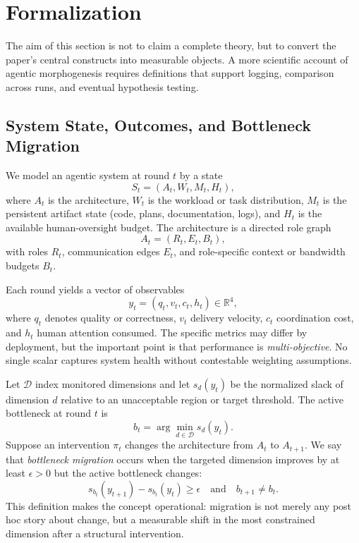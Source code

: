 \section{Formalization}

The aim of this section is not to claim a complete theory, but to convert the paper's central constructs into measurable objects. A more scientific account of agentic morphogenesis requires definitions that support logging, comparison across runs, and eventual hypothesis testing.

\subsection{System State, Outcomes, and Bottleneck Migration}

We model an agentic system at round $t$ by a state
\begin{equation}
S_t = (A_t, W_t, M_t, H_t),
\end{equation}
where $A_t$ is the architecture, $W_t$ is the workload or task distribution, $M_t$ is the persistent artifact state (code, plans, documentation, logs), and $H_t$ is the available human-oversight budget. The architecture is a directed role graph
\begin{equation}
A_t = (R_t, E_t, B_t),
\end{equation}
with roles $R_t$, communication edges $E_t$, and role-specific context or bandwidth budgets $B_t$.

Each round yields a vector of observables
\begin{equation}
y_t = (q_t, v_t, c_t, h_t) \in \mathbb{R}^4,
\end{equation}
where $q_t$ denotes quality or correctness, $v_t$ delivery velocity, $c_t$ coordination cost, and $h_t$ human attention consumed. The specific metrics may differ by deployment, but the important point is that performance is \emph{multi-objective}. No single scalar captures system health without contestable weighting assumptions.

Let $\mathcal{D}$ index monitored dimensions and let $s_d(y_t)$ be the normalized slack of dimension $d$ relative to an unacceptable region or target threshold. The active bottleneck at round $t$ is
\begin{equation}
b_t = \arg\min_{d \in \mathcal{D}} s_d(y_t).
\end{equation}
Suppose an intervention $\pi_t$ changes the architecture from $A_t$ to $A_{t+1}$. We say that \emph{bottleneck migration} occurs when the targeted dimension improves by at least $\epsilon > 0$ but the active bottleneck changes:
\begin{equation}
s_{b_t}(y_{t+1}) - s_{b_t}(y_t) \geq \epsilon
\quad \text{and} \quad
b_{t+1} \neq b_t.
\end{equation}
This definition makes the concept operational: migration is not merely any post hoc story about change, but a measurable shift in the most constrained dimension after a structural intervention.


